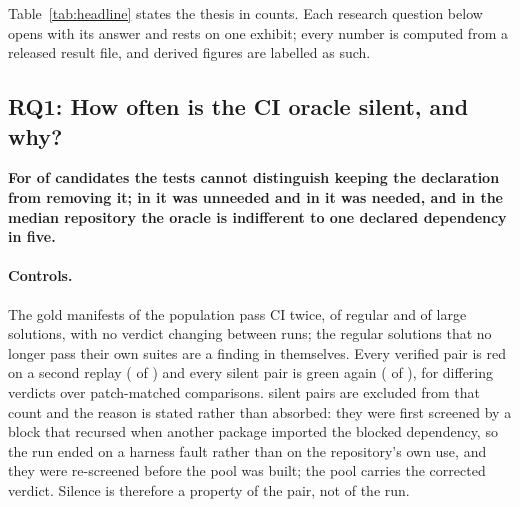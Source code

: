 \documentclass[11pt]{article}
\begin{document}
Table~\ref{tab:headline} states the thesis in counts.
Each research question below opens with its answer and rests on one exhibit; every number is computed from a released result file, and derived figures are labelled as such.

\subsection{RQ1: How often is the CI oracle silent, and why?}
\label{sec:rq1}

\textbf{For \nSilent{} of \nCand{} candidates the tests cannot distinguish keeping the declaration from removing it; in \nOverDecl{} it was unneeded and in \nStrict{} it was needed, and in the median repository the oracle is indifferent to one declared dependency in five.}

\paragraph{Controls.}
The gold manifests of the population pass CI twice, \nGoldPass{} of \nGold{} regular and \nGoldLargePass{} of \nGoldLargeCompared{} large solutions, with no verdict changing between runs; the \nGoldFail{} regular solutions that no longer pass their own suites are a finding in themselves.
Every verified pair is red on a second replay (\nRepeatVerified{} of \nRepeatVerified) and every silent pair is green again (\nRepeatSilent{} of \nRepeatSilent), for \nRepeatFlips{} differing verdicts over \nRepeatCompared{} patch-matched comparisons.
\nRepeatExcluded{} silent pairs are excluded from that count and the reason is stated rather than absorbed: they were first screened by a block that recursed when another package imported the blocked dependency, so the run ended on a harness fault rather than on the repository's own use, and they were re-screened before the pool was built; the pool carries the corrected verdict.
Silence is therefore a property of the pair, not of the run.
\end{document}
